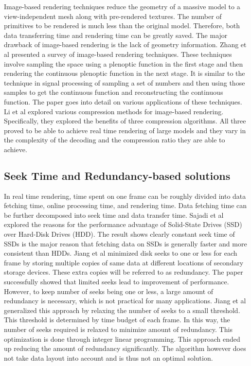\documentclass[conference]{acmsiggraph}
\begin{document}
Image-based rendering techniques reduce the geometry of a massive model to a view-independent mesh along with pre-rendered textures. The number of primitives to be rendered is much less than the original model. Therefore, both data transferring time and rendering time can be greatly saved. The major drawback of image-based rendering is the lack of geometry information. Zhang et al \cite{imagebasedrendering} presented a survey of image-based rendering techniques. These techniques involve sampling the space using a plenoptic function in the first stage and then rendering the continuous plenoptic function in the next stage. It is similar to the technique in signal processing of sampling a set of numbers and then using those samples to get the continuous function and reconstructing the continuous function. The paper goes into detail on various applications of these techniques. Li et al \cite{compressionimagebased} explored various compression methods for image-based rendering. Specifically, they explored the benefits of three compression algorithms. All three proved to be able to achieve real time rendering of large models and they vary in the complexity of the decoding and the compression ratio they are able to achieve. 

\subsection{Seek Time and Redundancy-based solutions}

In real time rendering, time spent on one frame can be roughly divided into data fetching time, online processing time, and rendering time. Data fetching time can be further decomposed into seek time and data transfer time. Sajadi et al \cite{ssdpaper} explored the reasons for the performance advantage of Solid-State Drives (SSD) over Hard-Disk Drives (HDD). The result shows clearly constant seek time of SSDs is the major reason that fetching data on SSDs is generally faster and more consistent than HDDs. Jiang et al \cite{singleseeklayout} minimized disk seeks to one or less for each frame by storing multiple copies of same data at different locations of secondary storage devices. These extra copies will be referred to as redundancy. The paper successfully showed that limited seeks lead to improvement of performance. However, to keep number of seeks being one or less, a large amount of redundancy is necessary, which is not practical for many applications. Jiang et al \cite{optimizingredundancy} generalized this approach by relaxing the number of seeks to a small threshold. This threshold is determined by time budget of each frame. In this way, the number of seeks required is relaxed to minimize amount of redundancy. This optimization is done through integer linear programming. This approach ended up reducing the amount of redundancy significantly. The algorithm however does not take data layout into account and is thus not an optimal solution.
\end{document}
